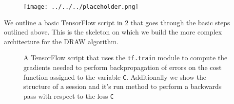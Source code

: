 \begin{figure}[H]
\centering
\texttt{[image: ../../../placeholder.png]}
\caption{}\label{fig:grad_graph}
\end{figure}

We outline a basic TensorFlow script in \ref{fig:tf_script} that goes through the basic steps outlined above. This is the skeleton on which we build the more complex architecture for the DRAW algorithm.

\begin{figure}[H] 
\centering

\caption{A TensorFlow script that uses the \lstinline{tf.train} module to compute the gradients needed to perform backpropagation of errors on the cost function assigned to the variable \lstinline{C}. Additionally we show the structure of a session and it's run method to perform a backwards pass with respect to the loss \lstinline{C}}\label{fig:tf_script}
\end{figure}
